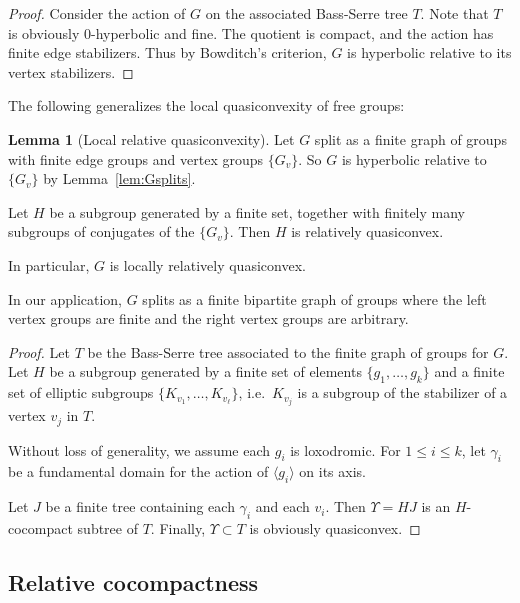 \documentclass[12pt,oneside]{amsart}
\theoremstyle{definition}
\newtheorem{lem}[thm]{Lemma}
\theoremstyle{definition}
\theoremstyle{remark}
\begin{document}
\begin{proof}
Consider the action of $G$ on the associated Bass-Serre tree $T$.
Note that $T$ is obviously $0$-hyperbolic and fine.
The quotient is compact, and the action has finite edge stabilizers. Thus by Bowditch's criterion, $G$ is hyperbolic relative to its vertex stabilizers.
\end{proof}

The following generalizes the local quasiconvexity of free groups:
\begin{lem}[Local relative quasiconvexity]\label{lem:LRHQC}
Let 
$G$ split as a finite graph of groups with finite edge groups and vertex groups $\{G_v\}$. 
So $G$ is hyperbolic relative to $\{G_v\}$ by Lemma~\ref{lem:Gsplits}.

Let $H$ be a subgroup generated by a finite set, together with finitely many subgroups of conjugates of the $\{G_v\}$. Then $H$ is relatively quasiconvex.

In particular, $G$ is locally relatively quasiconvex.
\end{lem}
In our application, $G$ splits as a 
finite bipartite graph of groups where the left vertex groups are finite and the right vertex groups are arbitrary.

\begin{proof}
Let $T$ be the Bass-Serre tree associated to the finite graph of groups for $G$. Let $H$ be a subgroup generated by a finite set of  elements $\{g_1, \dots, g_k\}$ and a finite set of elliptic subgroups $\{K_{v_1}, \dots, K_{v_\ell}\}$, i.e.\ $K_{v_j}$ is a subgroup of 
the stabilizer of a vertex $v_j$ in $T$. 

Without loss of generality, we assume each $g_i$ is loxodromic. For $1\leq i\leq k$, let $\gamma_i$ be a fundamental domain for the action of $\langle g_i\rangle$ on its axis. 

Let $J$ be a finite tree containing each $\gamma_i$ and each $v_i$.
Then $\Upsilon=HJ$ is an $H$-cocompact subtree of $T$. Finally, $\Upsilon\subset T$ is obviously quasiconvex.
\end{proof}

\subsection{Relative cocompactness}\label{sec: relative hyperbolicty}
\end{document}
